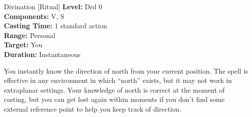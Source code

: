 {Divination [Ritual]}
{
	\textbf{Level:}
	Drd 0\\
	\textbf{Components:}
	V, S\\
	\textbf{Casting Time:}
	1 standard action\\
	\textbf{Range:}
	Personal\\
	\textbf{Target:}
	You\\
	\textbf{Duration:}
	Instantaneous\\
}
{
	You instantly know the direction of north from your current position. The spell is effective in any environment in which ``north'' exists, but it may not work in extraplanar settings. Your knowledge of north is correct at the moment of casting, but you can get lost again within moments if you don't find some external reference point to help you keep track of direction.

}

